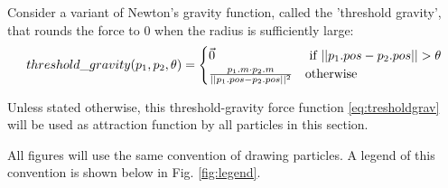 Consider a variant of Newton's gravity function, called the 'threshold gravity', that rounds the force to 0 when the radius is sufficiently large:
\begin{equation}
    threshold\_gravity(p_1, p_2, \theta) = \begin{cases}
        \vec{0} & \text{ if } \lvert\lvert p_1.pos - p_2.pos \rvert\rvert > \theta \\
        \frac{p_1.m \cdot p_2.m}{\lvert\lvert p_1.pos - p_2.pos \rvert\rvert^2} & \text{otherwise}
        \end{cases} \label{eq:tresholdgrav}
\end{equation}

Unless stated otherwise, this threshold-gravity force function \eqref{eq:tresholdgrav} will be used as attraction function by all particles in this section.

All figures will use the same convention of drawing particles. A legend of this convention is shown below in Fig. \ref{fig:legend}.

